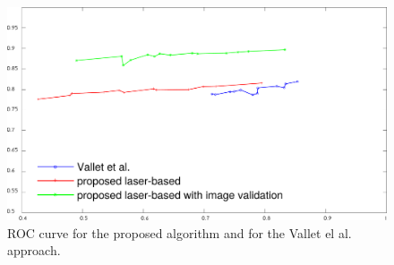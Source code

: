 \begin{figure}[t]
\centering
\includegraphics[width=\columnwidth]{./img/ch-laser/graphres2}
\caption{ROC curve for the proposed algorithm and for the Vallet el al.~\cite{vallet2015extracting} approach.}
\label{fig:roc}
\end{figure}





